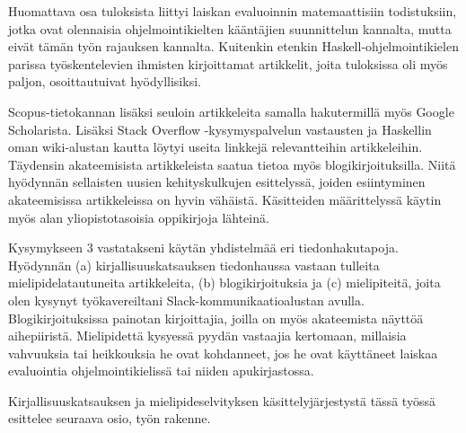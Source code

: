 Huomattava osa tuloksista liittyi laiskan evaluoinnin matemaattisiin todistuksiin, jotka ovat olennaisia ohjelmointikielten kääntäjien suunnittelun kannalta, mutta eivät tämän työn rajauksen kannalta. Kuitenkin etenkin Haskell-ohjelmointikielen parissa työskentelevien ihmisten kirjoittamat artikkelit, joita tuloksissa oli myös paljon, osoittautuivat hyödyllisiksi.

Scopus-tietokannan lisäksi seuloin artikkeleita samalla hakutermillä myös Google Scholarista. Lisäksi Stack Overflow -kysymyspalvelun vastausten ja Haskellin oman wiki-alustan kautta löytyi useita linkkejä relevantteihin artikkeleihin. Täydensin akateemisista artikkeleista saatua tietoa myös blogikirjoituksilla. Niitä hyödynnän sellaisten uusien kehityskulkujen esittelyssä, joiden esiintyminen akateemisissa artikkeleissa on hyvin vähäistä. Käsitteiden määrittelyssä käytin myös alan yliopistotasoisia oppikirjoja lähteinä.

\begin{sloppypar}
Kysymykseen 3 vastatakseni käytän yhdistelmää eri tiedonhakutapoja. Hyödynnän (a) kirjallisuuskatsauksen tiedonhaussa vastaan tulleita mielipidelatautuneita artikkeleita, (b) blogikirjoituksia ja (c) mielipiteitä, joita olen kysynyt työkavereiltani Slack-kommunikaatioalustan avulla. Blogikirjoituksissa painotan kirjoittajia, joilla on myös akateemista näyttöä aihepiiristä. Mielipidettä kysyessä pyydän vastaajia kertomaan, millaisia vahvuuksia tai heikkouksia he ovat kohdanneet, jos he ovat käyttäneet laiskaa evaluointia ohjelmointikielissä tai niiden apukirjastossa.
\end{sloppypar}

Kirjallisuuskatsauksen ja mielipideselvityksen käsittelyjärjestystä tässä työssä esittelee seuraava osio, työn rakenne.
